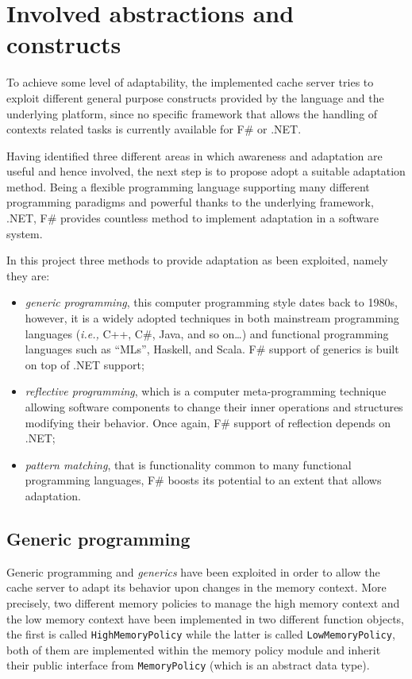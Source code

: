 \documentclass[11pt,a4paper]{article}
\begin{document}
\section{Involved abstractions and constructs}
\label{section:functionalities}
To achieve some level of adaptability, the implemented cache server tries to exploit different general purpose constructs provided by the language and the underlying platform, since no specific framework that allows the handling of contexts related tasks is currently available for F\# or .NET.

Having identified three different areas in which awareness and adaptation are useful and hence involved, the next step is to propose adopt a suitable adaptation method. Being a flexible programming language supporting many different programming paradigms and powerful thanks to the underlying framework, .NET, F\# provides countless method to implement adaptation in a software system.

In this project three methods to provide adaptation as been exploited, namely they are:
\begin{itemize}
\item \emph{generic programming}, this computer programming style dates back to 1980s, however, it is a widely adopted techniques in both mainstream programming languages (\emph{i.e.,} C++, C\#, Java, and so on\ldots) and functional programming languages such as ``MLs'', Haskell, and Scala. F\# support of generics is built on top of .NET support;
\item \emph{reflective programming}, which is a computer meta-programming technique allowing software components to change their inner operations and structures modifying their behavior. Once again, F\# support of reflection depends on .NET;
\item \emph{pattern matching}, that is functionality common to many functional programming languages, F\# boosts its potential to an extent that allows adaptation.
\end{itemize}

\subsection{Generic programming}
\label{section:functionalities:generics}
Generic programming and \emph{generics} have been exploited in order to allow the cache server to adapt its behavior upon changes in the memory context. More precisely, two different memory policies to manage the high memory context and the low memory context have been implemented in two different function objects, the first is called \texttt{HighMemoryPolicy} while the latter is called \texttt{LowMemoryPolicy}, both of them are implemented within the memory policy module and inherit their public interface from \texttt{MemoryPolicy} (which is an abstract data type).
\end{document}
